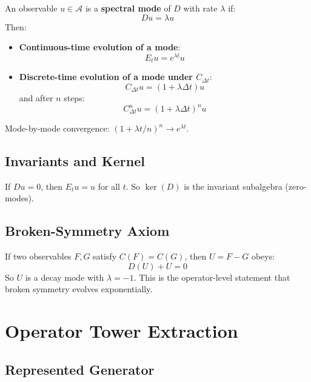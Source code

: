 \documentclass[12pt, oneside]{article}
\begin{document}
An observable $u \in \mathcal{A}$ is a \textbf{spectral mode} of $D$ with rate $\lambda$ if:
\begin{equation}
Du = \lambda u
\end{equation}
Then:
\begin{itemize}
    \item \textbf{Continuous-time evolution of a mode}:
    \begin{equation}
    E_t u = e^{\lambda t} u
    \end{equation}
    \item \textbf{Discrete-time evolution of a mode under $C_{\Delta t}$}:
    \begin{equation}
    C_{\Delta t} u = (1 + \lambda \Delta t) u
    \end{equation}
    and after $n$ steps:
    \begin{equation}
    C_{\Delta t}^n u = (1 + \lambda \Delta t)^n u
    \end{equation}
\end{itemize}
Mode-by-mode convergence: $(1 + \lambda t/n)^n \to e^{\lambda t}$.

\subsection{Invariants and Kernel}

If $Du = 0$, then $E_t u = u$ for all $t$. So $\ker(D)$ is the invariant subalgebra (zero-modes).

\subsection{Broken-Symmetry Axiom}

If two observables $F, G$ satisfy $C(F) = C(G)$, then $U = F - G$ obeys:
\begin{equation}
D(U) + U = 0
\end{equation}
So $U$ is a decay mode with $\lambda = -1$. This is the operator-level statement that broken symmetry evolves exponentially.

\section{Operator Tower Extraction}

\subsection{Represented Generator}
\end{document}
